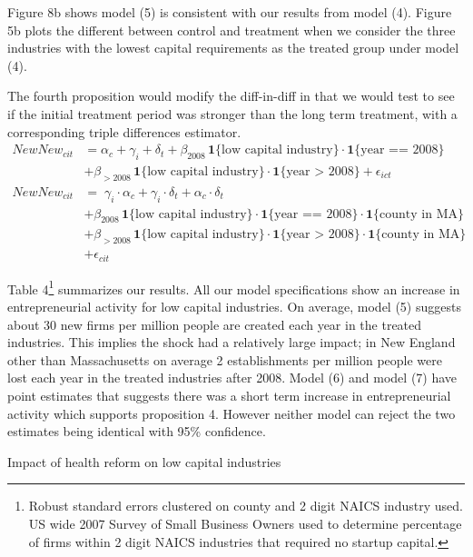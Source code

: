 \documentclass[12pt]{article}
\begin{document}
Figure 8b shows model (5) is consistent with our results from model (4). Figure 5b plots the different between control and treatment when we consider the three industries with the lowest capital requirements as the treated group under model (4).  

The fourth proposition would modify the diff-in-diff in that we would test to see if the initial treatment period was stronger than the long term treatment, with a corresponding triple differences estimator.
\begin{align}
NewNew_{cit} & =  \alpha_c + \gamma_i+ \delta_t  \nonumber + \beta_{2008} \, \mathbf{1}\{\text{low capital industry}\} \cdot \mathbf{1}\{\text{year == 2008}\} \nonumber \\
& + \beta_{>2008} \, \mathbf{1}\{\text{low capital industry}\} \cdot \mathbf{1}\{\text{year > 2008}\} + \epsilon_{ict} \\
NewNew_{cit} & =  \; \gamma_i \cdot \alpha_c + \gamma_i \cdot \delta_t +  \alpha_c \cdot \delta_t \nonumber   \\
& + \beta_{2008} \, \mathbf{1}\{\text{low capital industry}\} \cdot \mathbf{1}\{\text{year == 2008}\}  \cdot \mathbf{1}\{\text{county in MA}\} \nonumber  \\
& + \beta_{>2008} \, \mathbf{1}\{\text{low capital industry}\} \cdot \mathbf{1}\{\text{year > 2008}\}  \cdot \mathbf{1}\{\text{county in MA}\} \nonumber  \\
& + \epsilon_{cit}
\end{align}

Table 4\footnote{Robust standard errors clustered on county and 2 digit NAICS industry used. US wide 2007 Survey of Small Business Owners used to determine percentage of firms within 2 digit NAICS industries that required no startup capital.} summarizes our results. All our model specifications show an increase in entrepreneurial activity for low capital industries. On average, model (5) suggests about 30 new firms per million people are created each year in the treated industries. This implies the shock had a relatively large impact; in New England other than Massachusetts on average 2 establishments per million people were lost each year in the treated industries after 2008. Model (6) and model (7) have point estimates that suggests there was a short term increase in entrepreneurial activity which supports proposition 4. However neither model can reject the two estimates being identical with 95\% confidence. 
\begin{center}
	\begin{table}[H]
		\centering
		
		\caption{Impact of health reform on low capital industries}
	\end{table}
\end{center}
\end{document}

